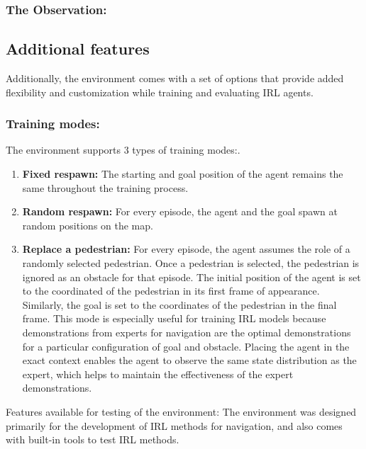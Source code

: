 \subsubsection{The Observation:}
\subsection{Additional features}
Additionally, the environment comes with a set of options that provide added flexibility and customization while training and evaluating IRL agents.
\subsubsection{Training modes:}
The environment supports 3 types of training modes:. 
\begin{enumerate}
    \item \textbf{Fixed respawn:} The starting and goal position of the agent remains the same throughout the training process.
    \item \textbf{Random respawn:} For every episode, the agent and the goal spawn at random positions on the map. 
    \item \textbf{Replace a pedestrian:} For every episode, the agent assumes the role of a randomly selected pedestrian. Once a pedestrian is selected, the pedestrian is ignored as an obstacle for that episode. The initial position of the agent is set to the coordinated of the pedestrian in its first frame of appearance. Similarly, the goal is set to the coordinates of the pedestrian in the final frame.
    This mode is especially useful for training IRL models because demonstrations from experts for navigation are the optimal demonstrations for a particular configuration of goal and obstacle. Placing the agent in the exact context enables the agent to observe the same state distribution as the expert, which helps to maintain the effectiveness of the expert demonstrations. 
\end{enumerate}
Features available for testing of the environment:
The environment was designed primarily for the development of IRL methods for navigation, and also comes with built-in tools to test IRL methods.
